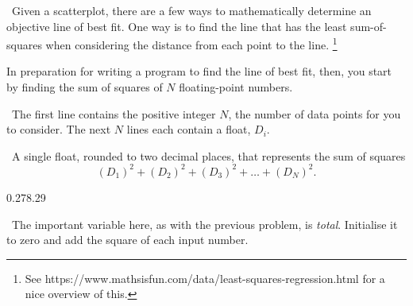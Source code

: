 

\Question\ Given a scatterplot, there are a few ways to mathematically determine an
objective line of best fit. One way is to find the line that has the least sum-of-squares
when considering the distance from each point to the line.%
\footnote{See https://www.mathsisfun.com/data/least-squares-regression.html for a nice
overview of this.}

In preparation for writing a program to find the line of best fit, then, you start by
finding the sum of squares of $N$ floating-point numbers.

\Input\ The first line contains the positive integer $N$, the number of data points for
you to consider. The next $N$ lines each contain a float, $D_i$.

\Output\ A single float, rounded to two decimal places, that represents the sum of squares
\[
  (D_1)^2 + (D_2)^2 + (D_3)^2 + \dots + (D_N)^2.
\]

\Sample

       {0.2}{78.29}

\Scratch\ The important variable here, as with the previous problem, is \emph{total}.
Initialise it to zero and add the square of each input number.
